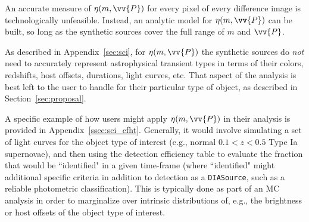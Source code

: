 \documentclass[DM,lsstdraft,toc]{lsstdoc}
\begin{document}
An accurate measure of $\eta(m,\vv{P})$ for every pixel of every difference image is technologically unfeasible.
Instead, an analytic model for $\eta(m,\vv{P})$ can be built, so long as the synthetic sources cover the full range of $m$ and $\vv{P}$.

As described in Appendix~\ref{sec:sci}, for $\eta(m,\vv{P})$ the synthetic sources do {\it not} need to accurately represent astrophysical transient types in terms of their colors, redshifts, host offsets, durations, light curves, etc.
That aspect of the analysis is best left to the user to handle for their particular type of object, as described in Section~\ref{sec:proposal}.

A specific example of how users might apply $\eta(m,\vv{P})$ in their analysis is provided in Appendix~\ref{ssec:sci_cfht}.
Generally, it would involve simulating a set of light curves for the object type of interest (e.g., normal $0.1<z<0.5$ Type Ia supernovae), and then using the detection efficiency table to evaluate the fraction that would be ``identified" in a given time-frame (where ``identified" might additional specific criteria in addition to detection as a {\tt DIASource}, such as a reliable photometric classification).
This is typically done as part of an MC analysis in order to marginalize over intrinsic distributions of, e.g., the brightness or host offsets of the object type of interest.
\end{document}
